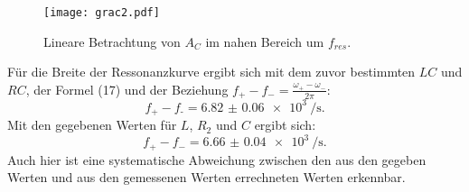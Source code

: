 \begin{figure}[H]
	\centering
	\caption{Lineare Betrachtung von $A_C$ im nahen Bereich um $f_{res}$.}
	\texttt{[image: grac2.pdf]}
	\label{fig:grac2}
\end{figure}

Für die Breite der Ressonanzkurve ergibt sich mit dem zuvor bestimmten $LC$ und $RC$, der Formel (17) und der Beziehung $f_+ - f_- = \frac{\omega_+ - \omega_-}{2\pi}$:
\begin{displaymath}
f_\text{+} - f_\text{-} = \SI{6.82(6)e3}{\per\second}\text{.}
\end{displaymath}
Mit den gegebenen Werten für $L$, $R_2$ und $C$ ergibt sich:
\begin{displaymath}
f_+ - f_- = \SI{6.66(4)e3}{\per\second}\text{.}
\end{displaymath}
Auch hier ist eine systematische Abweichung zwischen den aus den gegeben Werten und aus den gemessenen Werten errechneten Werten erkennbar.


